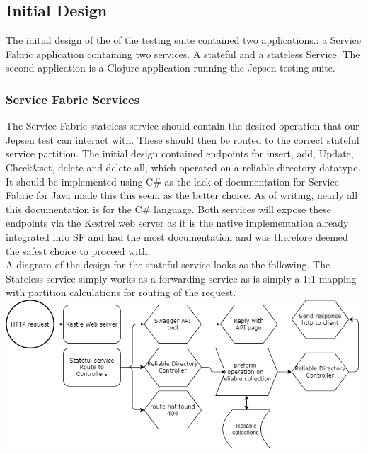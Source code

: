 \documentclass[a4paper,10pt,titlepage]{report}
\begin{document}
    \subsection{Initial Design}

    The initial design of the of the testing suite contained two applications.: a Service Fabric application containing two services. A stateful and a stateless Service. The second application is a Clojure application running the Jepsen testing suite.

    \subsubsection{Service Fabric Services}

    The Service Fabric stateless service should contain the desired operation that our Jepsen test can interact with. These should then be routed to the correct stateful service partition. The initial design contained endpoints for insert, add, Update, Check\&set, delete and delete all, which operated on a reliable directory datatype. It should be implemented using C\# as the lack of documentation for Service Fabric for Java made this this seem as the better choice. As of writing, nearly all this documentation is for the C\# language. Both services will expose these endpoints via the Kestrel web server as it is the native implementation already integrated into SF and had the most documentation and was therefore deemed the safest choice to proceed with.\\
    \vspace{5mm}
    A diagram of the design for the stateful service looks as the following. The Stateless service simply works as a forwarding service as is simply a 1:1 mapping with partition calculations for routing of the request. \\
    \vspace{5mm}
    \includegraphics[scale=0.5]{images/Design_Stateful_service_1.0.drawio.png}
\end{document}
